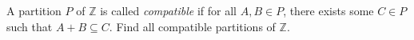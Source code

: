 A partition $P$ of $\mathbb{Z}$ is called \emph{compatible} if for all $A,B\in P$, there exists some $C\in P$ such that $A+B\subseteq C$. Find all compatible partitions of $\mathbb{Z}$.